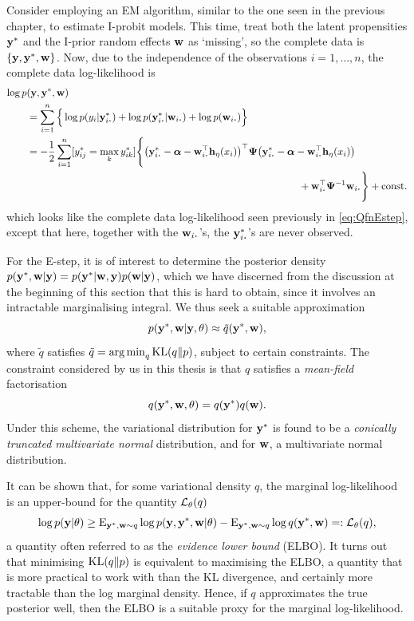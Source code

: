 Consider employing an EM algorithm, similar to the one seen in the previous chapter, to estimate I-probit models.
This time, treat both the latent propensities ${\mathbf y}^*$ and the I-prior random effects ${\mathbf w}$ as `missing', so the complete data is $\{{\mathbf y},{\mathbf y}^*,{\mathbf w}\}$.
Now, due to the independence of the observations $i=1,\dots,n$, the complete data log-likelihood is
\begin{align*}
  \log p&(\by,\by^*,\bw) \\
  &= \sum_{i=1}^n \Big\{ 
  \log p(y_i|\by^*_{i \bigcdot}) + \log p(\by^*_{i \bigcdot}|\bw_{i \bigcdot}) + \log p(\bw_{i \bigcdot}) 
  \Big\} \\
  &= - \half \sum_{i=1}^n [y_{ij}^* = \max_k y_{ik}^*] \Bigg\{
    \big(\by^*_{i \bigcdot} - \balpha - \bw_{i \bigcdot}^\top\bh_\eta(x_i)\big)^\top 
    \bPsi 
    \big(\by^*_{i \bigcdot} - \balpha - \bw_{i \bigcdot}^\top\bh_\eta(x_i)\big) \\
  &\hspace{9.5cm} + \bw_{i \bigcdot}^\top \bPsi^{-1} \bw_{i \bigcdot} \Bigg\} 
   + \const
\end{align*}
which looks like the complete data log-likelihood seen previously in \cref{eq:QfnEstep}, except that here, together with the $\bw_{i \bigcdot}$'s, the $\by^*_{i \bigcdot}$'s are never observed.

For the E-step, it is of interest to determine the posterior density $p({\mathbf y}^*,{\mathbf w}|{\mathbf y}) = p({\mathbf y}^*|{\mathbf w},{\mathbf y})p({\mathbf w}|{\mathbf y})$, which we have discerned from the discussion at the beginning of this section that this is hard to obtain, since it involves an intractable marginalising integral.
We thus seek a suitable approximation
\[
  p({\mathbf y}^*,{\mathbf w} | {\mathbf y}, \theta) \approx \tilde q({\mathbf y}^*,{\mathbf w}),
\]
where $\tilde q$ satisfies $\tilde q = \operatorname*{arg\,min}_q \operatorname{KL}(q\Vert p)$, subject to certain constraints.
The constraint considered by us in this thesis is that $q$ satisfies a \emph{mean-field} factorisation
\[
  q({\mathbf y}^*,{\mathbf w},\theta) = q({\mathbf y}^*)q({\mathbf w}).
\]
Under this scheme, the variational distribution for ${\mathbf y}^*$ is found to be a \emph{conically truncated multivariate normal} distribution, and for ${\mathbf w}$, a multivariate normal distribution.

It can be shown that, for some variational density $q$, the marginal log-likelihood is an upper-bound for the quantity ${\mathcal L}_\theta(q)$
\[
  \log p({\mathbf y}|\theta) \geq 
    \operatorname{E}_{{\mathbf y}^*,{\mathbf w}\sim q} \log p({\mathbf y},{\mathbf y}^*,{\mathbf w}|\theta)
    - \operatorname{E}_{{\mathbf y}^*,{\mathbf w}\sim q} \log  q({\mathbf y}^*,{\mathbf w}) =: {\mathcal L}_\theta(q),
\]
a quantity often referred to as the \emph{evidence lower bound} (ELBO).
It turns out that minimising $\operatorname{KL}(q\Vert p)$ is equivalent to maximising the ELBO, a quantity that is more practical to work with than the KL divergence, and certainly more tractable than the log marginal density.
Hence, if $q$ approximates the true posterior well, then the ELBO is a suitable proxy for the marginal log-likelihood.

